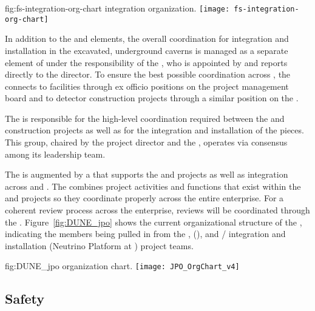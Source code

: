 \begin{dunefigure}{fig:fs-integration-org-chart}
  {  integration organization.}
  \texttt{[image: fs-integration-org-chart]} %
\end{dunefigure}

In addition to the  and  elements, the 
overall coordination for integration and installation  
in the excavated, underground caverns is managed as a separate
element of  under the responsibility of 
the , who is appointed by and reports directly to the 
 director.  To ensure the best possible coordination 
across , the  connects 
to facilities through 
ex officio positions on the  project management board 
and to detector construction projects through a similar position on the  .

The  is responsible for the high-level
coordination required between the  and  construction 
projects as well as for the integration and 
installation of the  pieces. This group, chaired by the  project director and the ,  operates via  
consensus among its leadership team. 

The  is augmented by a  that supports the
 and  projects as well as integration
across  and . The  
combines project activities and functions that exist within the 
 and  projects so they  
 coordinate properly across the entire enterprise.    
For a coherent review process across the 
 enterprise, reviews will be coordinated 
through the . 
Figure~\ref{fig:DUNE_jpo} shows the current organizational 
structure of the , indicating the members being 
pulled in from the ,  (), and 
/ integration and installation (Neutrino Platform at ) 
project teams.

\begin{dunefigure}{fig:DUNE_jpo}
  { organization chart.}
  \texttt{[image: JPO\_OrgChart\_v4]}
\end{dunefigure}


\subsection{Safety}
\label{sec:dune_safety}


